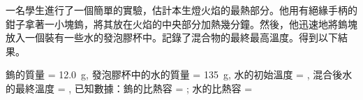 {
}{}

{
    一名學生進行了一個簡單的實驗，估計本生燈火焰的最熱部分。他用有絕緣手柄的鉗子拿著一小塊鎢，將其放在火焰的中央部分加熱幾分鐘。然後，他迅速地將鎢塊放入一個裝有一些水的發泡膠杯中。記錄了混合物的最終最高溫度。得到以下結果。
    \par 鎢的質量 = \qty{12.0}{g},
    發泡膠杯中的水的質量 = \qty{135}{g},
    水的初始溫度 = ,
    混合後水的最終溫度 = ,
    已知數據：鎢的比熱容 = ; 水的比熱容 = 

}{}

{

}{}